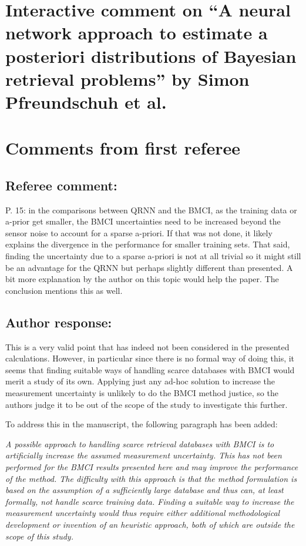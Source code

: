 \documentclass[journal abbreviation, manuscript]{copernicus}
\author{simon}
\date{\today}
\title{}
\begin{document}
\setlength{\parindent}{0cm}

\section*{Interactive comment on ``A neural network approach to estimate a posteriori distributions of Bayesian retrieval problems'' by Simon Pfreundschuh et al.}

\section{Comments from first referee}

\subsection*{Referee comment:}

P. 15: in the comparisons between QRNN and the BMCI, as the training data or a-prior
get smaller, the BMCI uncertainties need to be increased beyond the sensor noise to
account for a sparse a-priori.  If that was not done, it likely explains the divergence in
the performance for smaller training sets.  That said, finding the uncertainty due to a
sparse a-priori is not at all trivial so it might still be an advantage for the QRNN but
perhaps slightly different than presented. A bit more explanation by the author on this
topic would help the paper. The conclusion mentions this as well.

\subsection*{Author response:}

This is a very valid point that has indeed not been considered in the presented
calculations. However, in particular since there is no formal way of doing this,
it seems that finding suitable ways of handling scarce databases with BMCI would
merit a study of its own. Applying just any ad-hoc solution to increase the
measurement uncertainty is unlikely to do the BMCI method justice, so the authors
judge it to be out of the scope of the study to investigate this further.

To address this in the manuscript, the following paragraph has been added:

\vspace{1em}

\textit{
A possible approach to handling scarce retrieval databases with BMCI is to
artificially increase the assumed measurement uncertainty. This has not been
performed for the BMCI results presented here and may improve the performance of
the method. The difficulty with this approach is that the method formulation
is based on the assumption of a sufficiently large database and thus can,
at least formally, not handle scarce training data. Finding a suitable way to
increase the measurement uncertainty would thus require either additional
methodological development or invention of an heuristic approach, both of which
are outside the scope of this study.}
\end{document}

